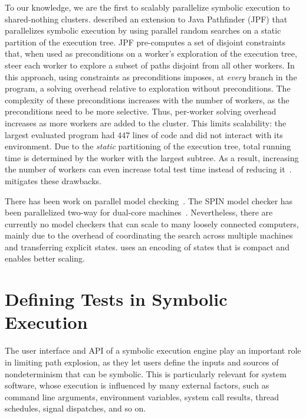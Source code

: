 To our knowledge, we are the first to scalably parallelize symbolic execution to shared-nothing clusters.
%
\cite{parallelSymbex} described an extension to Java Pathfinder (JPF) that parallelizes symbolic execution by using parallel random searches on a static partition of the execution tree.  JPF pre-computes a set of disjoint constraints that, when used as preconditions on a worker's exploration of the execution tree, steer each worker to explore a subset of paths disjoint from all other workers.  In this approach, using constraints as preconditions imposes, at {\em every} branch in the program, a solving overhead relative to exploration without preconditions.  The complexity of these preconditions increases with the number of workers, as the preconditions need to be more selective.  Thus, per-worker solving overhead increases as more workers are added to the cluster.  This limits scalability: the largest evaluated program had 447 lines of code and did not interact with its environment.  Due to the {\em static} partitioning of the execution tree, total running time is determined by the worker with the largest subtree.  As a result, increasing the number of workers can even increase total test time instead of reducing it~\cite{parallelSymbex}.  \cnine mitigates these drawbacks.

There has been work on parallel model checking~\cite{parallelMurphi,distributed-spin,loadBalModelchecking,spin:multicore-modelchecking,modelCheckBDD}.  The SPIN model checker has been parallelized two-way for dual-core machines~\cite{parallelSPIN}. Nevertheless, there are currently no model checkers that can scale to many loosely connected computers, mainly due to the overhead of coordinating the search across multiple machines and transferring explicit states. \cnine uses an encoding of states that is compact and enables better scaling.

\fi


\section{Defining Tests in Symbolic Execution}
\label{sec:relwork:symtests}

The user interface and API of a symbolic execution engine play an important role in limiting path explosion, as they let users define the inputs and sources of nondeterminism that can be symbolic.  This is particularly relevant for system software, whose execution is influenced by many external factors, such as command line arguments, environment variables, system call results, thread schedules, signal dispatches, and so on.

